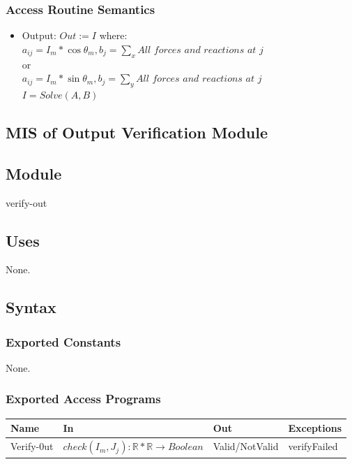\documentclass[12pt, titlepage]{article}
\begin{document}
\subsubsection{Access Routine Semantics}
\begin{itemize}
    \item Output: $Out:=I$ where:\\
    
    $a_{ij}=I_m*\cos\theta_{m},b_j=\sum_x \textit{All forces and reactions at j}$\\
or\\
$a_{ij}=I_m*\sin\theta_{m},b_j=\sum_y \textit{All forces and reactions at j}$\\

$I=Solve(A,B)$\\
\end{itemize}
\subsection{MIS of Output Verification Module \label{mSpec} }

\subsection{Module}

verify-out

\subsection{Uses}
None.

\subsection{Syntax}

\subsubsection{Exported Constants}
None.
\subsubsection{Exported Access Programs}
\begin{center}
\begin{tabular}{p{2cm} p{4cm} p{4cm} p{2cm}}
\hline
\textbf{Name} & \textbf{In} & \textbf{Out} & \textbf{Exceptions} \\
\hline

Verify-0ut & $check(I_m,J_j):\mathbb{R}*\mathbb{R} \rightarrow {Boolean}$  & Valid/NotValid & verifyFailed \\
\hline
\end{tabular}
\end{center}
\end{document}
